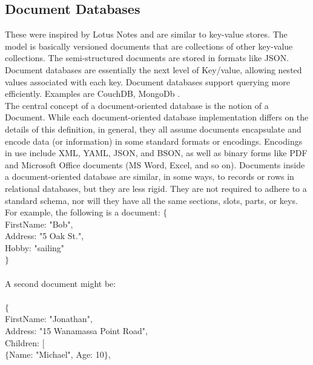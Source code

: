 \subsection{Document Databases}
\hspace*{0.7in} These were inspired by Lotus Notes and are similar to key-value stores. The model is basically versioned documents that are collections of other key-value collections. The semi-structured documents are stored in formats like JSON. Document databases are essentially the next level of Key/value, allowing nested values associated with each key.  Document databases support querying more efficiently. Examples are CouchDB, MongoDb \cite{8}. \\
\hspace*{0.7in} The central concept of a document-oriented database is the notion of a Document. While each document-oriented database implementation differs on the details of this definition, in general, they all assume documents encapsulate and encode data (or information) in some standard formats or encodings. Encodings in use include XML, YAML, JSON, and BSON, as well as binary forms like PDF and Microsoft Office documents (MS Word, Excel, and so on). Documents inside a document-oriented database are similar, in some ways, to records or rows in relational databases, but they are less rigid. They are not required to adhere to a standard schema, nor will they have all the same sections, slots, parts, or keys. For example, the following is a document:
$\{$ \\
\hspace*{0.4in} FirstName: "Bob", \\
\hspace*{0.4in} Address: "5 Oak St.", \\
\hspace*{0.4in} Hobby: "sailing" \\
$\}$
\\
\\
A second document might be: \\
\\
$\{$ \\
\hspace*{0.4in} FirstName: "Jonathan",  \\
\hspace*{0.4in} Address: "15 Wanamassa Point Road", \\
\hspace*{0.4in} Children: [ \\
\hspace*{0.4in} $\{$Name: "Michael", Age: 10$\}$,   \\
